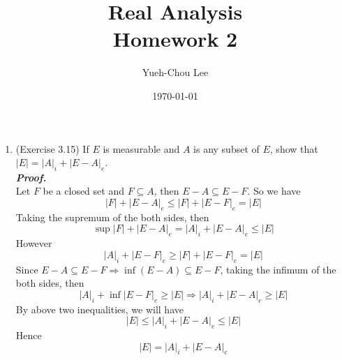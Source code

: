 \documentclass[a4paper,11pt]{article}
\title{Real Analysis \\ Homework 2}
\author{Yueh-Chou Lee}
\date{\today}
\begin{document}
\maketitle
\begin{enumerate}

\item (Exercise 3.15) If $E$ is measurable and $A$ is any subset of $E$, show that $|E| = |A|_i + |E-A|_e$.\\
\newline
\textit{\textbf {Proof.}}\\
Let $F$ be a closed set and $F \subseteq A$, then $E-A \subseteq E-F$.
So we have
$$|F| + |E-A|_e \leq |F| + |E-F|_e = |E|$$
Taking the supremum of the both sides, then
$$\sup|F| + |E-A|_e = |A|_i + |E-A|_e \leq |E|$$
However
$$|A|_i + |E-F|_e \geq |F| + |E-F|_e = |E|$$
Since $E - A \subseteq E - F \Rightarrow \inf (E - A) \subseteq E - F$, taking the infimum of the both sides, then
$$|A|_i + \inf |E - F|_e \geq |E| \Rightarrow |A|_i + |E - A|_e \geq |E|$$
By above two inequalities, we will have
$$|E| \leq |A|_i + |E - A|_e \leq |E|$$
Hence
$$|E| = |A|_i + |E-A|_e$$
\newline



\end{enumerate}
\end{document}
